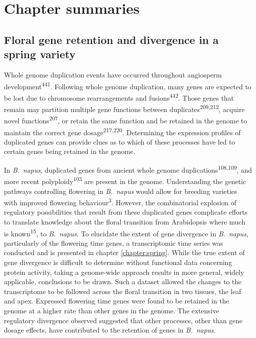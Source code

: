 \documentclass[12pt,]{book}
\begin{document}
\section{Chapter summaries}\label{chapter-summaries}

\subsection{Floral gene retention and divergence in a spring
variety}\label{floral-gene-retention-and-divergence-in-a-spring-variety}

Whole genome duplication events have occurred throughout angiosperm
development\textsuperscript{441}. Following whole genome duplication,
many genes are expected to be lost due to chromosome rearrangements and
fusions\textsuperscript{442}. Those genes that remain may partition
multiple gene functions between duplicates\textsuperscript{209,212},
acquire novel functions\textsuperscript{207}, or retain the same
function and be retained in the genome to maintain the correct gene
dosage\textsuperscript{217,220}. Determining the expression profiles of
duplicated genes can provide clues as to which of these processes have
led to certain genes being retained in the genome.

In \emph{B.~napus}, duplicated genes from ancient whole genome
duplications\textsuperscript{108,109}, and more recent
polyploidy\textsuperscript{103} are present in the genome. Understanding
the genetic pathways controlling flowering in \emph{B.~napus} would
allow for breeding varieties with improved flowering
behaviour\textsuperscript{3}. However, the combinatorial explosion of
regulatory possibilities that result from these duplicated genes
complicate efforts to translate knowledge about the floral transition
from Arabidopsis where much is known\textsuperscript{15}, to
\emph{B.~napus}. To elucidate the extent of gene divergence in
\emph{B.~napus}, particularly of the flowering time genes, a
transcriptomic time series was conducted and is presented in chapter
\ref{chapter:spring}. While the true extent of gene divergence is
difficult to determine without functional data concerning protein
activity, taking a genome-wide approach results in more general, widely
applicable, conclusions to be drawn. Such a dataset allowed the changes
to the transcriptome to be followed across the floral transition in two
tissues, the leaf and apex. Expressed flowering time genes were found to
be retained in the genome at a higher rate than other genes in the
genome. The extensive regulatory divergence observed suggested that
other processes, other than gene dosage effects, have contributed to the
retention of genes in \emph{B.~napus}.
\end{document}
